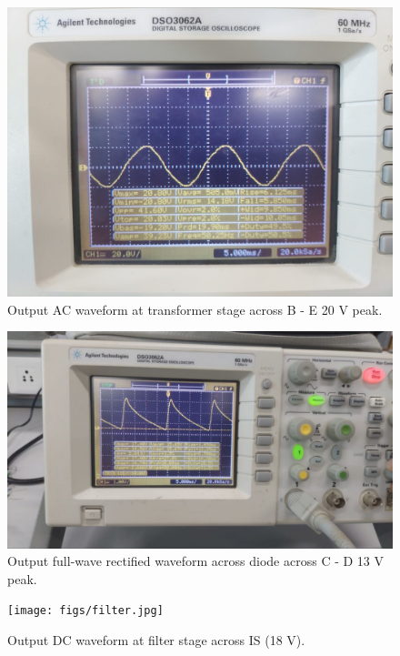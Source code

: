 \documentclass[journal,12pt,twocolumn]{IEEEtran}
\begin{document}
	\begin{figure}[!ht]
		\includegraphics[width=\columnwidth]{figs/transformerf.jpg}
		\caption{Output AC waveform at transformer stage across B - E 20 V peak.}
		\label{fig:transformer}
	\end{figure}
	
	\begin{figure}[!ht]
		\includegraphics[width=\columnwidth]{figs/rectified.jpg}
		\caption{Output full-wave rectified waveform across diode across C - D 13 V peak.}
		\label{fig:rectifier}
	\end{figure}
	
	\begin{figure}[!ht]
		\texttt{[image: figs/filter.jpg]}
		\caption{Output DC waveform at filter stage across IS (18 V).}
		\label{fig:filter}
	\end{figure}
	
\end{document}
